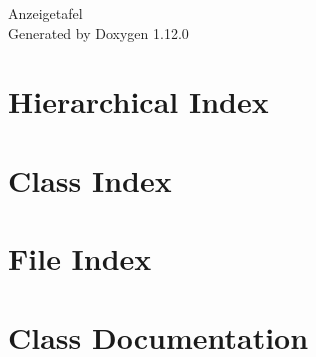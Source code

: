 \documentclass[twoside]{book}
\newcommand{\+}{\discretionary{\mbox{\scriptsize$\hookleftarrow$}}{}{}}
\newcommand{\clearemptydoublepage}{%
    \newpage{\pagestyle{empty}\cleardoublepage}%
  }
\begin{document}
  \raggedbottom
    \hypersetup{pageanchor=false,
                bookmarksnumbered=true,
                pdfencoding=unicode
               }
  \begin{titlepage}
  \vspace*{7cm}
  \begin{center}%
  {\Large Anzeigetafel}\\
  \vspace*{1cm}
  {\large Generated by Doxygen 1.12.0}\\
  \end{center}
  \end{titlepage}
  \clearemptydoublepage
  \tableofcontents
  \clearemptydoublepage
  \hypersetup{pageanchor=true}

\chapter{Hierarchical Index}

\chapter{Class Index}

\chapter{File Index}

\chapter{Class Documentation}














\end{document}
